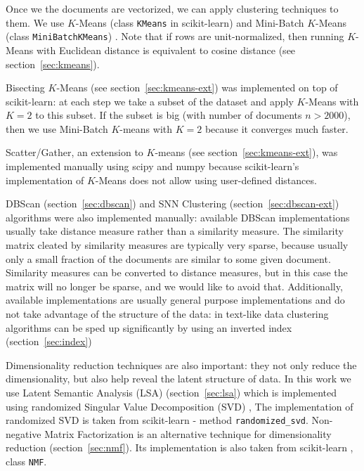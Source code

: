 Once we the documents are vectorized, we can apply clustering techniques
to them. We use $K$-Means (class \verb|KMeans| in scikit-learn) and 
Mini-Batch $K$-Means (class \verb|MiniBatchKMeans|) \cite{scikit-learn}.
Note that if rows are unit-normalized, then running $K$-Means with 
Euclidean distance is equivalent to cosine distance 
(see section~\ref{sec:kmeans}).

Bisecting $K$-Means (see section~\ref{sec:kmeans-ext}) was implemented on top of 
scikit-learn: at each step we take a subset of the dataset and apply 
$K$-Means with $K = 2$ to this subset. If the subset is big (with number of 
documents $n > 2000$), then we use Mini-Batch $K$-means with $K=2$ 
because it converges much faster. 

Scatter/Gather, an extension to $K$-means (see section~\ref{sec:kmeans-ext}), was 
implemented manually  using scipy \cite{scipy} and numpy \cite{walt2011numpy} because 
scikit-learn's implementation of $K$-Means does not allow using user-defined distances.

DBScan (section~\ref{sec:dbscan}) and SNN Clustering (section~\ref{sec:dbscan-ext})
algorithms were also implemented manually:
available DBScan implementations usually take distance measure rather than 
a similarity measure. The similarity matrix cleated by similarity measures 
are typically very sparse, because usually only a small fraction of the documents 
are similar to some given document. Similarity measures 
can be converted to distance measures, but in this case 
the matrix will no longer be sparse, and we would like to avoid that.
Additionally, available implementations are usually general purpose 
implementations and do not take advantage of the structure of the data:
in text-like data clustering algorithms can be sped up significantly 
by using an inverted index (section~\ref{sec:index})


Dimensionality reduction techniques are also important: they 
not only reduce the dimensionality, but also help reveal the latent 
structure of data. In this work we use Latent Semantic Analysis (LSA) (section~\ref{sec:lsa})
which is implemented using randomized Singular Value Decomposition (SVD) 
\cite{tropp2009finding}, The implementation of randomized SVD is taken from scikit-learn 
\cite{scikit-learn} - method \verb|randomized_svd|. Non-negative Matrix Factorization 
is an alternative technique for dimensionality reduction (section~\ref{sec:nmf}). 
Its implementation is also taken from scikit-learn \cite{scikit-learn}, 
class \verb|NMF|.

